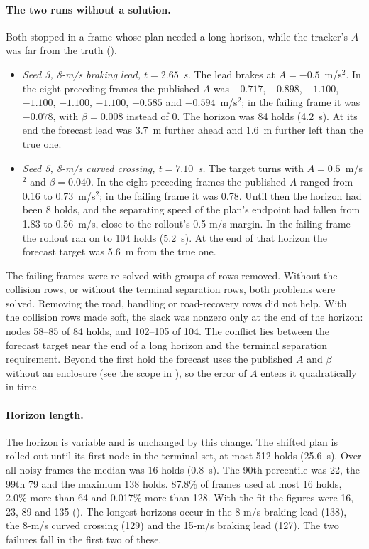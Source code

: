 \documentclass[11pt]{article}
\begin{document}
\paragraph{The two runs without a solution.} Both stopped in a frame whose plan
needed a long horizon, while the tracker's $A$ was far from the truth
().
\begin{itemize}
\item \emph{Seed 3, 8-m/s braking lead, $t=2.65$~s.} The lead brakes at
  $A=-0.5$~m/s$^2$. In the eight preceding frames the published $A$ was
  $-0.717$, $-0.898$, $-1.100$, $-1.100$, $-1.100$, $-1.100$, $-0.585$ and
  $-0.594$~m/s$^2$; in the failing frame it was $-0.078$, with
  $\beta=0.008$ instead of 0. The horizon was 84 holds (4.2~s). At its end the
  forecast lead was 3.7~m further ahead and 1.6~m further left than the
  true one.
\item \emph{Seed 5, 8-m/s curved crossing, $t=7.10$~s.} The target turns with
  $A=0.5$~m/s$^2$ and $\beta=0.040$. In the eight preceding frames the
  published $A$ ranged from 0.16 to 0.73~m/s$^2$; in the failing frame it was
  0.78. Until then the horizon had been 8 holds, and the separating speed of
  the plan's endpoint had fallen from 1.83 to 0.56~m/s, close to the
  rollout's 0.5-m/s margin. In the failing frame the rollout ran on to 104
  holds (5.2~s). At the end of that horizon the forecast target was 5.6~m from
  the true one.
\end{itemize}
The failing frames were re-solved with groups of rows removed. Without the
collision rows, or without the terminal separation rows, both problems were
solved. Removing the road, handling or road-recovery rows did not help. With
the collision rows made soft, the slack was nonzero only at the end of the
horizon: nodes 58--85 of 84 holds, and 102--105 of 104. The conflict lies
between the forecast target near the end of a long horizon and the terminal
separation requirement. Beyond the first hold the forecast uses the published
$A$ and $\beta$ without an enclosure (see the scope in
), so the error of $A$ enters it
quadratically in time.

\paragraph{Horizon length.} The horizon is variable and is unchanged by this
change. The shifted plan is rolled out until its first node in the terminal
set, at most 512 holds (25.6~s). Over all noisy frames the median was 16 holds
(0.8~s). The 90th percentile was 22, the 99th 79 and the maximum 138 holds.
87.8\% of frames used at most 16 holds, 2.0\% more than 64 and 0.017\% more
than 128. With the fit the figures were 16, 23, 89 and 135
(). The longest
horizons occur in the 8-m/s braking lead (138), the 8-m/s curved crossing
(129) and the 15-m/s braking lead (127). The two failures fall in the first
two of these.
\end{document}
